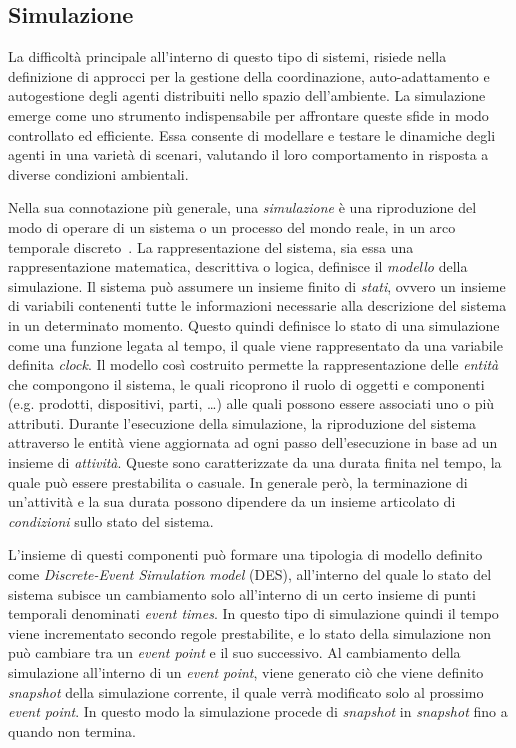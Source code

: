 \subsection{Simulazione}\label{ssec:simulation}
La difficoltà principale all'interno di questo tipo di sistemi, risiede nella definizione di approcci per la gestione della coordinazione, auto-adattamento
e autogestione degli agenti distribuiti nello spazio dell'ambiente.
La simulazione emerge come uno strumento indispensabile per affrontare queste sfide in modo controllato ed efficiente. Essa consente di modellare e testare
le dinamiche degli agenti in una varietà di scenari, valutando il loro comportamento in risposta a diverse condizioni ambientali.

Nella sua connotazione più generale, una \textit{simulazione} è una riproduzione del modo di operare di un sistema o un processo del mondo reale, in un
arco temporale discreto~\cite{discrete-event-simulation}.
La rappresentazione del sistema, sia essa una rappresentazione matematica, descrittiva o logica, definisce il \textit{modello}
della simulazione. Il sistema può assumere un insieme finito di \textit{stati}, ovvero un insieme di variabili contenenti
tutte le informazioni necessarie alla descrizione del sistema in un determinato momento. Questo quindi definisce lo stato di una simulazione come una
funzione legata al tempo, il quale viene rappresentato da una variabile definita \textit{clock}. Il modello così costruito permette la rappresentazione
delle \textit{entità} che compongono il sistema, le quali ricoprono il ruolo di oggetti e componenti (e.g. prodotti, dispositivi, parti, \dots)
alle quali possono essere associati uno o più attributi. Durante l'esecuzione della simulazione, la riproduzione del sistema attraverso le entità
viene aggiornata ad ogni passo dell'esecuzione in base ad un insieme di \textit{attività}. Queste sono caratterizzate da una durata finita
nel tempo, la quale può essere prestabilita o casuale. In generale però, la terminazione
di un'attività e la sua durata possono dipendere da un insieme articolato di \textit{condizioni} sullo stato del sistema.

L'insieme di questi componenti può formare una tipologia di modello definito come \textit{Discrete-Event Simulation model} (DES), all'interno del quale
lo stato del sistema subisce un cambiamento solo all'interno di un certo insieme di punti temporali denominati \textit{event times}. In questo tipo
di simulazione quindi il tempo viene incrementato secondo regole prestabilite, e lo stato della simulazione non può cambiare tra un \textit{event point}
e il suo successivo. Al cambiamento della simulazione all'interno di un \textit{event point}, viene generato ciò che viene definito \textit{snapshot} della
simulazione corrente, il quale verrà modificato solo al prossimo \textit{event point}. In questo modo la simulazione procede di \textit{snapshot} in \textit{snapshot}
fino a quando non termina.

